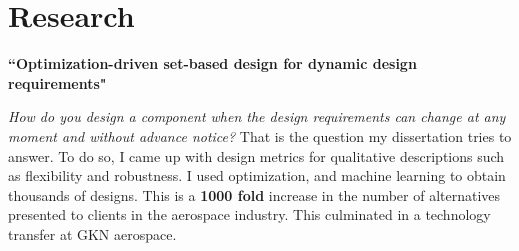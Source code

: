 \documentclass[10pt]{article} %
\begin{document}


\makeprofile %


\vspace{-\baselineskip} %

\section{Research}

{\raggedright\textbf{``Optimization-driven set-based design for dynamic design requirements"}}
\textit{\center How do you design a component when the design requirements can change at any moment and without advance notice?}
That is the question my dissertation tries to answer. To do so, I came up with design metrics for qualitative descriptions such as flexibility and robustness. I used optimization, and machine learning to obtain thousands of designs. This is a \textbf{1000 fold} increase in the number of alternatives presented to clients in the aerospace industry. This culminated in a technology transfer at GKN aerospace.

~~~~~
\end{document}
